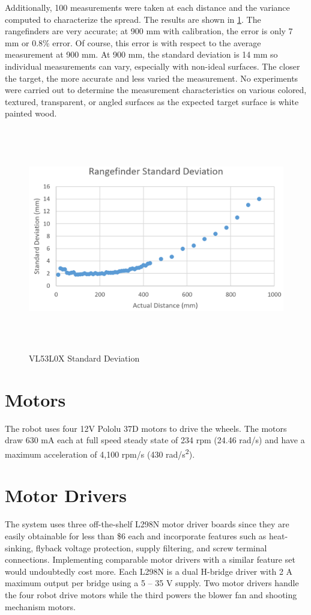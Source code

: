 Additionally, 100 measurements were taken at each distance and the variance computed to characterize the spread. The results are shown in \ref{fig:rangefinder_stddev}. The rangefinders are very accurate; at 900 mm with calibration, the error is only 7 mm or 0.8\% error. Of course, this error is with respect to the average measurement at 900 mm. At 900 mm, the standard deviation is 14 mm so individual measurements can vary, especially with non-ideal surfaces. The closer the target, the more accurate and less varied the measurement. No experiments were carried out to determine the measurement characteristics on various colored, textured, transparent, or angled surfaces as the expected target surface is white painted wood.

\begin{figure}[H]   %
	\centering \includegraphics[width=6in, height=3.85in, keepaspectratio]{figures/rangefinder_stddev.png}
	\caption{VL53L0X Standard Deviation}\label{fig:rangefinder_stddev}
\end{figure}

\section{Motors}
The robot uses four 12V Pololu 37D motors to drive the wheels. The motors draw 630 mA each at full speed steady state of 234 rpm (24.46 rad/s) and have a maximum acceleration of 4,100 rpm/s (430 rad/s\textsuperscript{2}).

\section{Motor Drivers}
The system uses three off-the-shelf L298N motor driver boards since they are easily obtainable for less than \$6 each and incorporate features such as heat-sinking, flyback voltage protection, supply filtering, and screw terminal connections. Implementing comparable motor drivers with a similar feature set would undoubtedly cost more. Each L298N is a dual H-bridge driver with 2 A maximum output per bridge using a 5 -- 35 V supply. Two motor drivers handle the four robot drive motors while the third powers the blower fan and shooting mechanism motors. 

